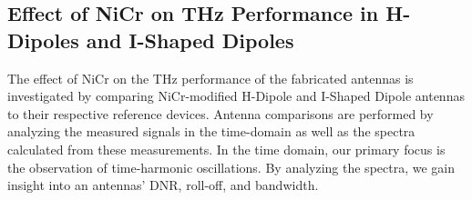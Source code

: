\subsection{Effect of NiCr on THz Performance in H-Dipoles and I-Shaped Dipoles}

The effect of NiCr on the THz performance of the fabricated antennas is investigated by comparing NiCr-modified H-Dipole and I-Shaped Dipole antennas to their respective reference devices. Antenna comparisons are performed by analyzing the measured signals in the time-domain as well as the spectra calculated from these measurements. In the time domain, our primary focus is the observation of time-harmonic oscillations. By analyzing the spectra, we gain insight into an antennas’ DNR, roll-off, and bandwidth. 




